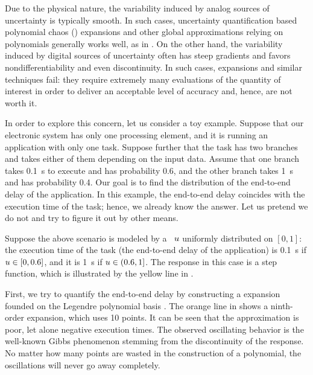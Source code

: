 
Due to the physical nature, the variability induced by analog sources of
uncertainty is typically smooth. In such cases, uncertainty quantification based
polynomial chaos () expansions \cite{xiu2010} and other global
approximations relying on polynomials generally works well, as in
\cite{bhardwaj2008, lee2013, ukhov2014, ukhov2015}. On the other hand, the
variability induced by digital sources of uncertainty often has steep gradients
and favors nondifferentiability and even discontinuity. In such cases, 
expansions and similar techniques fail: they require extremely many evaluations
of the quantity of interest in order to deliver an acceptable level of accuracy
and, hence, are not worth it.

In order to explore this concern, let us consider a toy example. Suppose that
our electronic system has only one processing element, and it is running an
application with only one task. Suppose further that the task has two branches
and takes either of them depending on the input data. Assume that one branch
takes 0.1~s to execute and has probability 0.6, and the other branch takes 1~s
and has probability 0.4. Our goal is to find the distribution of the end-to-end
delay of the application. In this example, the end-to-end delay coincides with
the execution time of the task; hence, we already know the answer. Let us
pretend we do not and try to figure it out by other means.

Suppose the above scenario is modeled by a \rv\ $u$ uniformly distributed on
$[0, 1]$: the execution time of the task (the end-to-end delay of the
application) is 0.1~s if $u \in [0, 0.6]$, and it is 1~s if $u \in (0.6, 1]$.
The response in this case is a step function, which is illustrated by the yellow
line in .

First, we try to quantify the end-to-end delay by constructing a 
expansion founded on the Legendre polynomial basis \cite{xiu2010}. The orange
line in  shows a ninth-order  expansion, which uses 10
points. It can be seen that the approximation is poor, let alone negative
execution times. The observed oscillating behavior is the well-known Gibbs
phenomenon stemming from the discontinuity of the response. No matter how many
points are wasted in the construction of a polynomial, the oscillations will
never go away completely.

